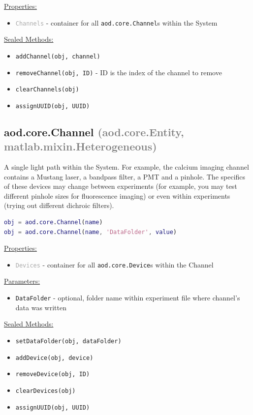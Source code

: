 \documentclass[10pt]{exam}
\newcommand\myparent[1]{\textcolor{gray}{(#1)}}
\newcommand\aodparam[1]{\textcolor{codepurple}{\texttt{#1}}}
\newcommand\aodclass[1]{\textcolor{codeblue}{\texttt{#1}}}
\newcommand\aodprop[1]{\textcolor{darkgray}{\texttt{#1}}}
\newcommand\aodfcn[1]{\textcolor{darkteal}{\texttt{#1}}}
\newcommand\docheader[1]{\vspace{0.6ex}\noindent\underline{#1}\vspace{0.15ex}}
\begin{document}
		\docheader{Properties:}
		\begin{itemize}
			\item \aodprop{Channels} - container for all \aodclass{aod.core.Channel}s within the System
		\end{itemize}
		\docheader{Sealed Methods:}
		\begin{itemize}
			\item \aodfcn{addChannel(obj, channel)}
			\item \aodfcn{removeChannel(obj, ID)} - ID is the index of the channel to remove
			\item \aodfcn{clearChannels(obj)}
			\item \aodfcn{assignUUID(obj, UUID)}
		\end{itemize}
		
	\subsection{aod.core.Channel \myparent{aod.core.Entity, matlab.mixin.Heterogeneous}} 
		\label{subsection:ChannelDoc}
		\noindent A single light path within the System. For example, the calcium imaging channel contains a Mustang laser, a bandpass filter, a PMT and a pinhole. The specifics of these devices may change between experiments (for example, you may test different pinhole sizes for fluorescence imaging) or even within experiments (trying out different dichroic filters).
		
		\begin{lstlisting}[language=matlab]
obj = aod.core.Channel(name)
obj = aod.core.Channel(name, 'DataFolder', value)
		\end{lstlisting}
		
		\docheader{Properties:}
		\begin{itemize}
			\item \aodprop{Devices} - container for all \aodclass{aod.core.Device}s within the Channel
		\end{itemize}
		\docheader{Parameters:}
		\begin{itemize}
			\item \aodparam{DataFolder} - optional, folder name within experiment file where channel's data was written
		\end{itemize}
		\docheader{Sealed Methods:}
		\begin{itemize}
			\item \aodfcn{setDataFolder(obj, dataFolder)}
			\item \aodfcn{addDevice(obj, device)}
			\item \aodfcn{removeDevice(obj, ID)}
			\item \aodfcn{clearDevices(obj)}
			\item \aodfcn{assignUUID(obj, UUID)}
		\end{itemize}
\end{document}
